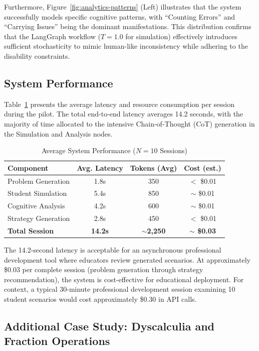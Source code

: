 \documentclass[11pt]{article}
\begin{document}
Furthermore, Figure~\ref{fig:analytics-patterns} (Left) illustrates that the system successfully models specific cognitive patterns, with ``Counting Errors'' and ``Carrying Issues'' being the dominant manifestations. This distribution confirms that the LangGraph workflow ($T=1.0$ for simulation) effectively introduces sufficient stochasticity to mimic human-like inconsistency while adhering to the disability constraints.

\subsection{System Performance}

Table~\ref{tab:performance} presents the average latency and resource consumption per session during the pilot. The total end-to-end latency averages 14.2 seconds, with the majority of time allocated to the intensive Chain-of-Thought (CoT) generation in the Simulation and Analysis nodes.

\begin{table}[H]
\centering
\caption{Average System Performance ($N=10$ Sessions)}
\label{tab:performance}
\begin{tabular}{lccc}
\toprule
\textbf{Component} & \textbf{Avg. Latency} & \textbf{Tokens (Avg)} & \textbf{Cost (est.)} \\
\midrule
Problem Generation & 1.8s & 350 & $<$ \$0.01 \\
Student Simulation & 5.4s & 850 & $\sim$ \$0.01 \\
Cognitive Analysis & 4.2s & 600 & $\sim$ \$0.01 \\
Strategy Generation & 2.8s & 450 & $<$ \$0.01 \\
\midrule
\textbf{Total Session} & \textbf{14.2s} & \textbf{$\sim$2,250} & \textbf{$\sim$ \$0.03} \\
\bottomrule
\end{tabular}
\end{table}

The 14.2-second latency is acceptable for an asynchronous professional development tool where educators review generated scenarios. At approximately \$0.03 per complete session (problem generation through strategy recommendation), the system is cost-effective for educational deployment. For context, a typical 30-minute professional development session examining 10 student scenarios would cost approximately \$0.30 in API calls.

\subsection{Additional Case Study: Dyscalculia and Fraction Operations}
\end{document}
